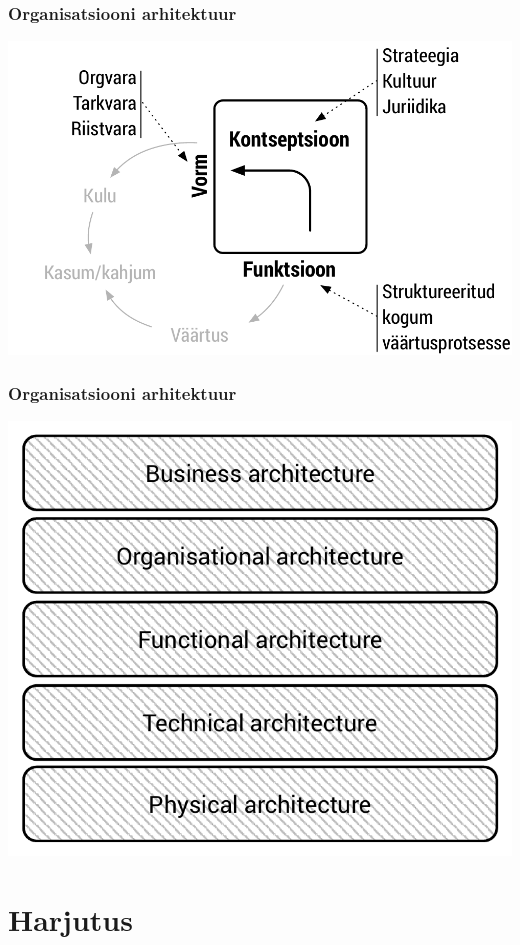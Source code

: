 \documentclass{beamer}
\begin{document}
\begin{frame}[fragile]
	\frametitle{Organisatsiooni arhitektuur}

	\begin{center}
	\includegraphics[width=\textwidth]{orgstruktuur.pdf}
	\end{center}
\end{frame}

\begin{frame}[fragile]
	\frametitle{Organisatsiooni arhitektuur}

	\begin{center}
	\includegraphics[width=.7\textwidth]{orgmodel.pdf}
	\end{center}
\end{frame}


\section{Harjutus}
\end{document}
